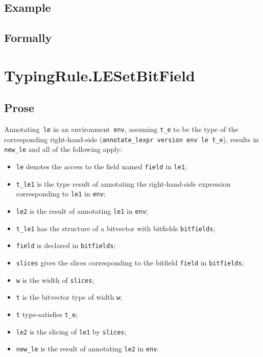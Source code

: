 \documentclass{book}
\begin{document}
\begin{itemize}
  \subsection{Example}



\begin{emptyformal}
    \subsection{Formally}
\end{emptyformal}


\section{TypingRule.LESetBitField \label{sec:TypingRule.LESetBitField}}

    \subsection{Prose}
   Annotating~\texttt{le} in an environment~\texttt{env}, assuming
\texttt{t\_e} to be the type of the corresponding right-hand-side
(\texttt{annotate\_lexpr version env le t\_e}), results in \texttt{new\_le} and
all of the following apply:
   \begin{itemize}
   \item \texttt{le} denotes the access to the field named \texttt{field} in \texttt{le1};
   \item \texttt{t\_le1} is the type result of annotating the right-hand-side expression corresponding to \texttt{le1} in \texttt{env};
   \item \texttt{le2} is the result of annotating \texttt{le1} in \texttt{env};
   \item \texttt{t\_le1} has the structure of a bitvector with bitfields \texttt{bitfields};
   \item \texttt{field} is declared in \texttt{bitfields};
   \item \texttt{slices} gives the slices corresponding to the bitfield \texttt{field} in
      \texttt{bitfields};
   \item \texttt{w} is the width of \texttt{slices};
   \item \texttt{t} is the bitvector type of width \texttt{w};
   \item \texttt{t} type-satisfies \texttt{t\_e};
   \item \texttt{le2} is the slicing of \texttt{le1} by \texttt{slices};
   \item \texttt{new\_le} is the result of annotating \texttt{le2} in \texttt{env}.
   \end{itemize}


\end{itemize}
\end{document}
